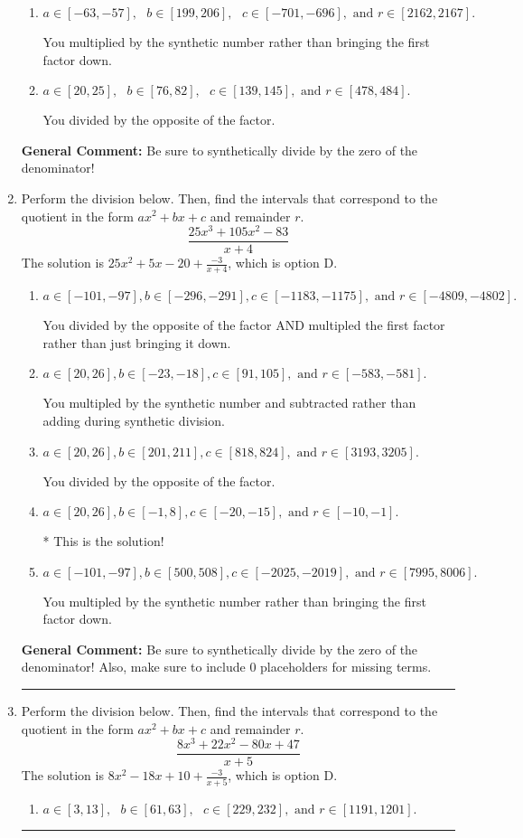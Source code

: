 \documentclass{extbook}[14pt]
\newcommand{\litem}[1]{\item #1

\rule{\textwidth}{0.4pt}}
\begin{document}
\begin{enumerate}
{\begin{enumerate}[label=\Alph*.]
* This is the solution!
\item \( a \in [-63, -57], \text{   } b \in [199, 206], \text{   } c \in [-701, -696], \text{   and   } r \in [2162, 2167]. \)

 You multiplied by the synthetic number rather than bringing the first factor down.
\item \( a \in [20, 25], \text{   } b \in [76, 82], \text{   } c \in [139, 145], \text{   and   } r \in [478, 484]. \)

 You divided by the opposite of the factor.
\end{enumerate}

\textbf{General Comment:} Be sure to synthetically divide by the zero of the denominator!
}
\litem{
Perform the division below. Then, find the intervals that correspond to the quotient in the form $ax^2+bx+c$ and remainder $r$.
\[ \frac{25x^{3} +105 x^{2} -83}{x + 4} \]The solution is \( 25x^{2} +5 x -20 + \frac{-3}{x + 4} \), which is option D.\begin{enumerate}[label=\Alph*.]
\item \( a \in [-101, -97], b \in [-296, -291], c \in [-1183, -1175], \text{ and } r \in [-4809, -4802]. \)

 You divided by the opposite of the factor AND multipled the first factor rather than just bringing it down.
\item \( a \in [20, 26], b \in [-23, -18], c \in [91, 105], \text{ and } r \in [-583, -581]. \)

 You multipled by the synthetic number and subtracted rather than adding during synthetic division.
\item \( a \in [20, 26], b \in [201, 211], c \in [818, 824], \text{ and } r \in [3193, 3205]. \)

 You divided by the opposite of the factor.
\item \( a \in [20, 26], b \in [-1, 8], c \in [-20, -15], \text{ and } r \in [-10, -1]. \)

* This is the solution!
\item \( a \in [-101, -97], b \in [500, 508], c \in [-2025, -2019], \text{ and } r \in [7995, 8006]. \)

 You multipled by the synthetic number rather than bringing the first factor down.
\end{enumerate}

\textbf{General Comment:} Be sure to synthetically divide by the zero of the denominator! Also, make sure to include 0 placeholders for missing terms.
}
\litem{
Perform the division below. Then, find the intervals that correspond to the quotient in the form $ax^2+bx+c$ and remainder $r$.
\[ \frac{8x^{3} +22 x^{2} -80 x + 47}{x + 5} \]The solution is \( 8x^{2} -18 x + 10 + \frac{-3}{x + 5} \), which is option D.\begin{enumerate}[label=\Alph*.]
\item \( a \in [3, 13], \text{   } b \in [61, 63], \text{   } c \in [229, 232], \text{   and   } r \in [1191, 1201]. \)


\end{enumerate}}
\end{enumerate}
\end{document}
